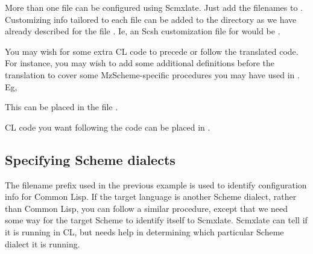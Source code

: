 More than one file can be configured using
Scmxlate.  Just add the filenames to
.  Customizing info
tailored to each file can be added to the 
directory as we have already described for the
file .  Ie, an Scsh customization file
for  would be
.

\iffalse
This kind of definition replacement is particularly
useful when the target language is Common Lisp.
For instance, let's say \p{progfile} contains
the definition

\q{
(define lassoc
  (lambda (k al equ?)
    (let loop ((al al))
      (if (null? al) #f
          (let ((c (car al)))
            (if (equ? (car c) k) c
                (loop (cdr al))))))))
}

Scmxlate will provide a complicated if working
Common Lisp translation of the above code, but it
will not be as simple as

\q{
(defun lassoc (k al equ?)
  (assoc k al :test equ?))
}

You can put this latter definition in
\p{dialects/cl-progfile} -- where the symbol \q{cl}
stands for Common Lisp -- and it will be used in
preference to the default translation.
\fi

You may wish for some extra CL code to precede or
follow the translated  code.  For instance,
you may wish to add some additional definitions before
the translation to cover some MzScheme-specific
procedures you may have used in .  Eg,


\n This can be placed in the file
.

CL code you want following the  code can be
placed in .

\subsection{Specifying Scheme dialects}

The filename prefix  used in the previous
example is used to identify configuration info
for Common Lisp.  If the target language is another
Scheme dialect, rather than Common Lisp, you can follow
a similar procedure, except that we need some way for
the target Scheme to identify itself to Scmxlate.
Scmxlate can tell if it is running in CL, but
needs help in determining which particular Scheme
dialect it is running.

